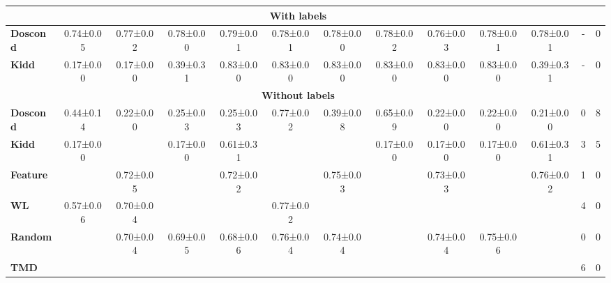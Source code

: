 \begin{table}[H]
\begin{subtable}{\textwidth}
{\begin{tabular}{l | c | c | c | c | c | c | c | c | c | c | c | c}
\hline
\multicolumn{12}{c}{\textbf{With labels}} \\
\hline
\textbf{Doscond} & 0.74±0.05 & 0.77±0.02 & 0.78±0.00 & 0.79±0.01 & 0.78±0.01 & 0.78±0.00 & 0.78±0.02 & 0.76±0.03 & 0.78±0.01 & 0.78±0.01 & - & 0 \\
\textbf{Kidd} & 0.17±0.00 & 0.17±0.00 & 0.39±0.31 & 0.83±0.00 & 0.83±0.00 & 0.83±0.00 & 0.83±0.00 & 0.83±0.00 & 0.83±0.00 & 0.39±0.31 &  - & 0 \\
\hline
\multicolumn{12}{c}{\textbf{Without labels}} \\
\hline
\textbf{Doscond} & 0.44±0.14 & 0.22±0.00 & 0.25±0.03 & 0.25±0.03 & 0.77±0.02 & 0.39±0.08 & 0.65±0.09 & 0.22±0.00 & 0.22±0.00 & 0.21±0.00 & 0 & 8\\
\textbf{Kidd} & 0.17±0.00 & \cellcolor{green!80}{0.83±0.00} & 0.17±0.00 & 0.61±0.31 & \cellcolor{green!80}{0.83±0.00} & \cellcolor{green!80}{0.83±0.00} & 0.17±0.00 & 0.17±0.00 & 0.17±0.00 & 0.61±0.31 & 3 & 5\\
\textbf{Feature} & \cellcolor{green!25}{0.65±0.06} & 0.72±0.05 & \cellcolor{green!25}{0.71±0.04} & 0.72±0.02 & \cellcolor{green!25}{0.78±0.01} & 0.75±0.03 & \cellcolor{green!25}{0.74±0.04} & 0.73±0.03 & \cellcolor{green!80}{0.78±0.02} & 0.76±0.02 & 1 & 0 \\
\textbf{WL} & 0.57±0.06 & 0.70±0.04 & \cellcolor{green!80}{0.75±0.02} & \cellcolor{green!25}{0.76±0.02} & 0.77±0.02 & \cellcolor{green!25}{0.77±0.02} & \cellcolor{green!80}{0.77±0.02} & \cellcolor{green!25}{0.77±0.02} & \cellcolor{green!80}{0.78±0.02} & \cellcolor{green!80}{0.78±0.01} & 4 & 0\\
\textbf{Random} & \cellcolor{green!25}{0.65±0.07} & 0.70±0.04 & 0.69±0.05 & 0.68±0.06 & 0.76±0.04 & 0.74±0.04 & \cellcolor{green!25}{0.74±0.03} & 0.74±0.04 & 0.75±0.06 & \cellcolor{green!25}{0.77±0.03} & 0 & 0 \\
\textbf{TMD} & \cellcolor{green!80}{0.70±0.04} & \cellcolor{green!25}{0.76±0.02} & \cellcolor{green!80}{0.75±0.03} & \cellcolor{green!80}{0.78±0.02} & \cellcolor{green!25}{0.78±0.02} & \cellcolor{green!25}{0.77±0.01} & \cellcolor{green!80}{0.77±0.01} & \cellcolor{green!80}{0.78±0.02} & \cellcolor{green!25}{0.77±0.02} & \cellcolor{green!80}{0.78±0.02} & 6 & 0 \\
\hline
\end{tabular}
}
\label{tab:proteins}
\end{subtable}

\vspace{1em}



\end{table}
